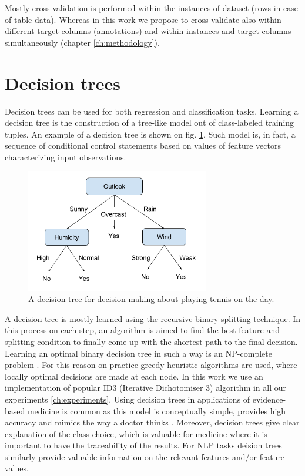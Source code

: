 Mostly cross-validation is performed within the instances of dataset (rows in case of table data). Whereas in this work we propose to cross-validate also within different target columns (annotations) and within instances and target columns simultaneously (chapter \ref{ch:methodology}).

\section{Decision trees}
Decision trees can be used for both regression and classification tasks. Learning a decision tree is the construction of a tree-like model out of class-labeled training tuples. An example of a decision tree is shown on fig. \ref{fig:decision-tree}. Such model is, in fact, a sequence of conditional control statements based on values of feature vectors characterizing input observations. 

\begin{figure}[h]
    \centering
    \includegraphics[width=8cm]{Images/Decision-tree.png}
    \caption{A decision tree for decision making about playing tennis on the day.}
    \label{fig:decision-tree}
\end{figure}

A decision tree is mostly learned using the recursive binary splitting technique. In this process on each step, an algorithm is aimed to find the best feature and splitting condition to finally come up with the shortest path to the final decision.
Learning an optimal binary decision tree in such a way is an NP-complete problem \citep{Hyafil-1976}. For this reason on practice greedy heuristic algorithms are used, where locally optimal decisions are made at each node. In this work we use an implementation of popular ID3 (Iterative Dichotomiser 3) algorithm \citep{Quinlan-1986} in all our experiments \ref{ch:experiments}. Using decision trees in applications of evidence-based medicine is common as this model is conceptually simple, provides high accuracy and mimics the way a doctor thinks \citep{Sackett-1996, Podgorelec-2002}. Moreover, decision trees give clear explanation of the class choice, which is valuable for medicine where it is important to have the traceability of the results. For NLP tasks deision trees similarly provide valuable information on the relevant features and/or feature values.

